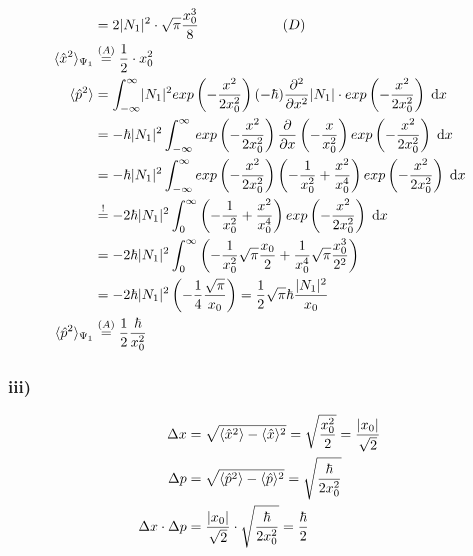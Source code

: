 \begin{align}
        &= 2 \lvert N_1\rvert^2 \cdot \sqrt{\pi} \frac{x_0^3}{8} \qquad \qquad \qquad (D)\\
        \langle \hat{x}^2 \rangle_{\Psi_1} &\stackrel{(A)}{=} \frac{1}{2} \cdot x_0^2\\
        \langle \hat{p}^2 \rangle &= \int_{-\infty}^{\infty} \lvert N_1\rvert^2 exp \left(- \frac{x^2}{2x_0^2} \right) (-\hbar) \frac{\partial ^2}{\partial x^2} 
        \lvert N_1\rvert \cdot exp \left(- \frac{x^2}{2x_0^2} \right) \; \mathrm{d}x\\
        &= - \hbar \lvert N_1\rvert^2 \int_{-\infty}^{\infty} exp \left(- \frac{x^2}{2x_0^2} \right) \frac{\partial}{\partial x} \left( -\frac{x}{x_0^2} 
        \right) exp \left(- \frac{x^2}{2x_0^2} \right) \; \mathrm{d}x \nonumber\\
        &= - \hbar \lvert N_1\rvert^2 \int_{-\infty}^{\infty} exp \left(- \frac{x^2}{2x_0^2} \right) \left( -\frac{1}{x_0^2} + \frac{x^2}{x_0^4} \right) 
        exp \left(- \frac{x^2}{2x_0^2} \right) \; \mathrm{d}x \nonumber\\
        &\stackrel{!}{=} -2 \hbar \lvert N_1\rvert^2 \int_{0}^{\infty} \left( -\frac{1}{x_0^2} + \frac{x^2}{x_0^4} \right) exp \left(- \frac{x^2}{2x_0^2}
        \right) \; \mathrm{d}x \nonumber\\
        &= -2 \hbar \lvert N_1\rvert^2 \int_{0}^{\infty} \left( -\frac{1}{x_0^2} \sqrt{\pi} \frac{x_0}{2} + \frac{1}{x_0^4} \sqrt{\pi} \frac{x_0^3}{2^2}
        \right) \nonumber\\
        &= -2 \hbar \lvert N_1\rvert^2 \left( -\frac{1}{4} \frac{\sqrt{\pi}}{x_0} \right) = \frac{1}{2} \sqrt{\pi} \hbar \frac{\lvert N_1\rvert^2}{x_0} \nonumber\\
        \langle \hat{p}^2 \rangle_{\Psi_1} &\stackrel{(A)}{=} \frac{1}{2} \frac{\hbar}{x_0^2}
    \end{align}

\subsubsection{iii)}

    \begin{align}
        \Delta x &= \sqrt{\langle \hat{x}^2 \rangle - \langle \hat{x} \rangle^2} = \sqrt{\frac{x_0^2}{2}} = \frac{\lvert x_0\rvert}{\sqrt{2}}\\
        \Delta p &= \sqrt{\langle \hat{p}^2 \rangle - \langle \hat{p} \rangle^2} = \sqrt{\frac{\hbar}{2 x_0^2}}\\
        \Delta x \cdot \Delta p &= \frac{\lvert x_0\rvert}{\sqrt{2}} \cdot \sqrt{\frac{\hbar}{2 x_0^2}}
        = \frac{\hbar}{2}
    \end{align}

